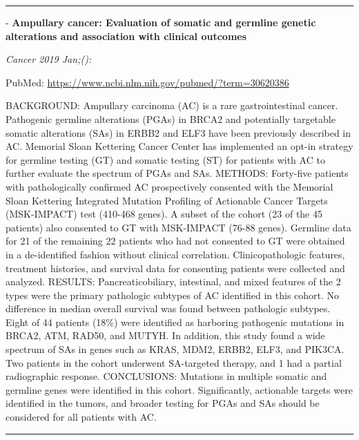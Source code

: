 \documentclass[]{article}
\begin{document}
\begin{center}\rule{0.5\linewidth}{\linethickness}\end{center}

 - \textbf{Ampullary cancer: Evaluation of somatic and germline genetic
alterations and association with clinical outcomes}

\emph{Cancer 2019 Jan;():}

PubMed: \url{https://www.ncbi.nlm.nih.gov/pubmed/?term=30620386}

BACKGROUND: Ampullary carcinoma (AC) is a rare gastrointestinal cancer.
Pathogenic germline alterations (PGAs) in BRCA2 and potentially
targetable somatic alterations (SAs) in ERBB2 and ELF3 have been
previously described in AC. Memorial Sloan Kettering Cancer Center has
implemented an opt-in strategy for germline testing (GT) and somatic
testing (ST) for patients with AC to further evaluate the spectrum of
PGAs and SAs. METHODS: Forty-five patients with pathologically confirmed
AC prospectively consented with the Memorial Sloan Kettering Integrated
Mutation Profiling of Actionable Cancer Targets (MSK-IMPACT) test
(410-468 genes). A subset of the cohort (23 of the 45 patients) also
consented to GT with MSK-IMPACT (76-88 genes). Germline data for 21 of
the remaining 22 patients who had not consented to GT were obtained in a
de-identified fashion without clinical correlation. Clinicopathologic
features, treatment histories, and survival data for consenting patients
were collected and analyzed. RESULTS: Pancreaticobiliary, intestinal,
and mixed features of the 2 types were the primary pathologic subtypes
of AC identified in this cohort. No difference in median overall
survival was found between pathologic subtypes. Eight of 44 patients
(18\%) were identified as harboring pathogenic mutations in BRCA2, ATM,
RAD50, and MUTYH. In addition, this study found a wide spectrum of SAs
in genes such as KRAS, MDM2, ERBB2, ELF3, and PIK3CA. Two patients in
the cohort underwent SA-targeted therapy, and 1 had a partial
radiographic response. CONCLUSIONS: Mutations in multiple somatic and
germline genes were identified in this cohort. Significantly, actionable
targets were identified in the tumors, and broader testing for PGAs and
SAs should be considered for all patients with AC.

{}

{}

\begin{center}\rule{0.5\linewidth}{\linethickness}\end{center}
\end{document}
